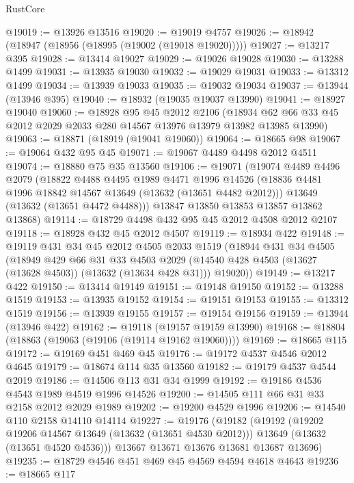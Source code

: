 \begin{lexlean}{RustCore}
\begin{coremodule}
@19019 := @13926 @13516
@19020 := @19019 @4757
@19026 := @18942 (@18947 (@18956 (@18995 (@19002 (@19018 @19020)))))
@19027 := @13217 @395
@19028 := @13414 @19027
@19029 := @19026 @19028
@19030 := @13288 @1499
@19031 := @13935 @19030
@19032 := @19029 @19031
@19033 := @13312 @1499
@19034 := @13939 @19033
@19035 := @19032 @19034
@19037 := @13944 (@13946 @395)
@19040 := @18932 (@19035 @19037 @13990)
@19041 := @18927 @19040
@19060 := @18928
    @95
    @45
    @2012
    @2106
    (@18934 @62 @66 @33 @45 @2012 @2029 @2033 @280 @14567 @13976 @13979 @13982 @13985 @13990)
@19063 := @18871 (@18919 (@19041 @19060))
@19064 := @18665 @98
@19067 := @19064 @432 @95 @45
@19071 := @19067 @4489 @4498 @2012 @4511
@19074 := @18880 @75 @35 @13560
@19106 := @19071
    (@19074
      @4489
      @4496
      @2079
      (@18822
        @4488
        @4495
        @1989
        @4471
        @1996
        @14526
        (@18836 @4481 @1996 @18842 @14567 @13649 (@13632 (@13651 @4482 @2012)))
        @13649
        (@13632 (@13651 @4472 @4488)))
      @13847
      @13850
      @13853
      @13857
      @13862
      @13868)
@19114 := @18729 @4498 @432 @95 @45 @2012 @4508 @2012 @2107
@19118 := @18928 @432 @45 @2012 @4507
@19119 := @18934 @422
@19148 := @19119
    @431
    @34
    @45
    @2012
    @4505
    @2033
    @1519
    (@18944
      @431
      @34
      @4505
      (@18949
        @429
        @66
        @31
        @33
        @4503
        @2029
        (@14540 @428 @4503 (@13627 (@13628 @4503)) (@13632 (@13634 @428 @31)))
        @19020))
@19149 := @13217 @422
@19150 := @13414 @19149
@19151 := @19148 @19150
@19152 := @13288 @1519
@19153 := @13935 @19152
@19154 := @19151 @19153
@19155 := @13312 @1519
@19156 := @13939 @19155
@19157 := @19154 @19156
@19159 := @13944 (@13946 @422)
@19162 := @19118 (@19157 @19159 @13990)
@19168 := @18804 (@18863 (@19063 (@19106 (@19114 @19162 @19060))))
@19169 := @18665 @115
@19172 := @19169 @451 @469 @45
@19176 := @19172 @4537 @4546 @2012 @4645
@19179 := @18674 @114 @35 @13560
@19182 := @19179 @4537 @4544 @2019
@19186 := @14506 @113 @31 @34 @1999
@19192 := @19186 @4536 @4543 @1989 @4519 @1996 @14526
@19200 := @14505 @111 @66 @31 @33 @2158 @2012 @2029 @1989
@19202 := @19200 @4529 @1996
@19206 := @14540 @110 @2158 @14110 @14114
@19227 := @19176
    (@19182
      (@19192
        (@19202 @19206 @14567 @13649 (@13632 (@13651 @4530 @2012)))
        @13649
        (@13632 (@13651 @4520 @4536)))
      @13667
      @13671
      @13676
      @13681
      @13687
      @13696)
@19235 := @18729 @4546 @451 @469 @45 @4569 @4594 @4618 @4643
@19236 := @18665 @117

\end{coremodule}
\end{lexlean}
